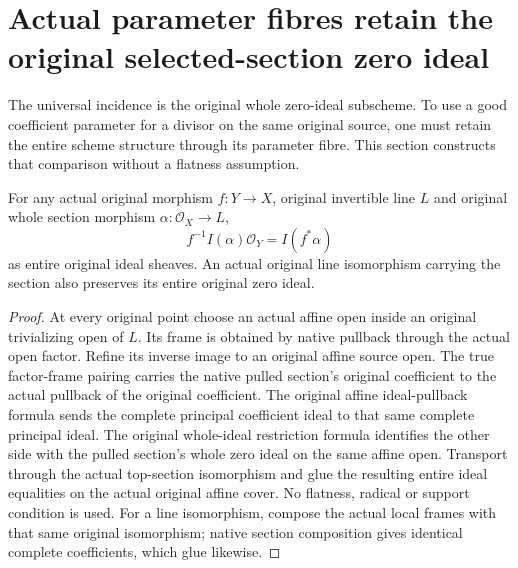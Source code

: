 \section{Actual parameter fibres retain the original selected-section zero ideal}

The universal incidence is the original whole zero-ideal subscheme. To use
a good coefficient parameter for a divisor on the same original source,
one must retain the entire scheme structure through its parameter fibre.
This section constructs that comparison without a flatness assumption.

\begin{lemma}
\label{lem:kn-nadel-bertini-zero-ideal-arbitrary-pullback}
\leanok
{}
For any actual original morphism $f:Y\to X$, original invertible line $L$
and original whole section morphism $\alpha:\mathcal O_X\to L$,
\[
 f^{-1}I(\alpha)\mathcal O_Y=I(f^*\alpha)
\]
as entire original ideal sheaves. An actual original line isomorphism
carrying the section also preserves its entire original zero ideal.
\end{lemma}
\begin{proof}
At every original point choose an actual affine open inside an original
trivializing open of $L$. Its frame is obtained by native pullback through
the actual open factor. Refine its inverse image to an original affine
source open. The true factor-frame pairing carries the native pulled
section's original coefficient to the actual pullback of the original
coefficient. The original affine ideal-pullback formula sends the complete
principal coefficient ideal to that same complete principal ideal. The
original whole-ideal restriction formula identifies the other side with
the pulled section's whole zero ideal on the same affine open. Transport
through the actual top-section isomorphism and glue the resulting entire
ideal equalities on the actual original affine cover. No flatness,
radical or support condition is used. For a line isomorphism, compose the
actual local frames with that same original isomorphism; native section
composition gives identical complete coefficients, which glue likewise.
\end{proof}

